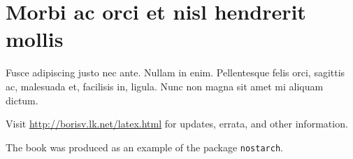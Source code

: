 \documentclass[cfonts]{nostarch}
\begin{document}
\chapter[Morbi ac orci]{Morbi ac orci et nisl hendrerit mollis}

Fusce adipiscing justo nec ante. Nullam in enim.  Pellentesque felis
orci, sagittis ac, malesuada et, facilisis in, ligula.
Nunc non magna sit amet mi aliquam dictum.

\backmatter

\nocite{*}



\printindex

\updatespage

Visit \url{http://borisv.lk.net/latex.html} for updates, errata, and other information.

\colophon

The book was produced as an example of the package \texttt{nostarch}. 
\end{document}
